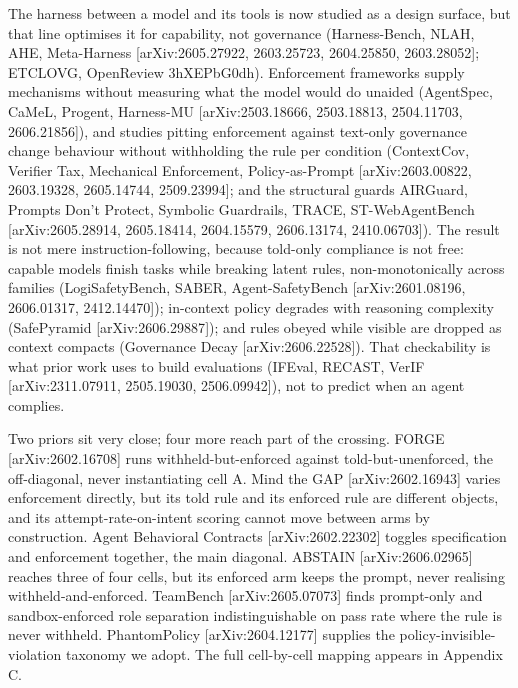 \documentclass[11pt]{article}
\begin{document}
The harness between a model and its tools is now studied as a design surface, but that line optimises it for capability, not governance (Harness-Bench, NLAH, AHE, Meta-Harness {[}arXiv:2605.27922, 2603.25723, 2604.25850, 2603.28052{]}; ETCLOVG, OpenReview 3hXEPbG0dh). Enforcement frameworks supply mechanisms without measuring what the model would do unaided (AgentSpec, CaMeL, Progent, Harness-MU {[}arXiv:2503.18666, 2503.18813, 2504.11703, 2606.21856{]}), and studies pitting enforcement against text-only governance change behaviour without withholding the rule per condition (ContextCov, Verifier Tax, Mechanical Enforcement, Policy-as-Prompt {[}arXiv:2603.00822, 2603.19328, 2605.14744, 2509.23994{]}; and the structural guards AIRGuard, Prompts Don't Protect, Symbolic Guardrails, TRACE, ST-WebAgentBench {[}arXiv:2605.28914, 2605.18414, 2604.15579, 2606.13174, 2410.06703{]}). The result is not mere instruction-following, because told-only compliance is not free: capable models finish tasks while breaking latent rules, non-monotonically across families (LogiSafetyBench, SABER, Agent-SafetyBench {[}arXiv:2601.08196, 2606.01317, 2412.14470{]}); in-context policy degrades with reasoning complexity (SafePyramid {[}arXiv:2606.29887{]}); and rules obeyed while visible are dropped as context compacts (Governance Decay {[}arXiv:2606.22528{]}). That checkability is what prior work uses to build evaluations (IFEval, RECAST, VerIF {[}arXiv:2311.07911, 2505.19030, 2506.09942{]}), not to predict when an agent complies.

Two priors sit very close; four more reach part of the crossing. FORGE {[}arXiv:2602.16708{]} runs withheld-but-enforced against told-but-unenforced, the off-diagonal, never instantiating cell A. Mind the GAP {[}arXiv:2602.16943{]} varies enforcement directly, but its told rule and its enforced rule are different objects, and its attempt-rate-on-intent scoring cannot move between arms by construction. Agent Behavioral Contracts {[}arXiv:2602.22302{]} toggles specification and enforcement together, the main diagonal. ABSTAIN {[}arXiv:2606.02965{]} reaches three of four cells, but its enforced arm keeps the prompt, never realising withheld-and-enforced. TeamBench {[}arXiv:2605.07073{]} finds prompt-only and sandbox-enforced role separation indistinguishable on pass rate where the rule is never withheld. PhantomPolicy {[}arXiv:2604.12177{]} supplies the policy-invisible-violation taxonomy we adopt. The full cell-by-cell mapping appears in Appendix C.
\end{document}
